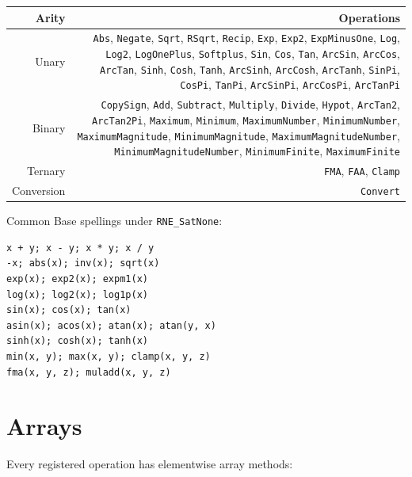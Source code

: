 \begin{table}[h]
\centering
\begin{tabulary}{\linewidth}{R R}
\toprule
Arity & Operations \\
\toprule
Unary & \texttt{Abs}, \texttt{Negate}, \texttt{Sqrt}, \texttt{RSqrt}, \texttt{Recip}, \texttt{Exp}, \texttt{Exp2}, \texttt{ExpMinusOne}, \texttt{Log}, \texttt{Log2}, \texttt{LogOnePlus}, \texttt{Softplus}, \texttt{Sin}, \texttt{Cos}, \texttt{Tan}, \texttt{ArcSin}, \texttt{ArcCos}, \texttt{ArcTan}, \texttt{Sinh}, \texttt{Cosh}, \texttt{Tanh}, \texttt{ArcSinh}, \texttt{ArcCosh}, \texttt{ArcTanh}, \texttt{SinPi}, \texttt{CosPi}, \texttt{TanPi}, \texttt{ArcSinPi}, \texttt{ArcCosPi}, \texttt{ArcTanPi} \\
Binary & \texttt{CopySign}, \texttt{Add}, \texttt{Subtract}, \texttt{Multiply}, \texttt{Divide}, \texttt{Hypot}, \texttt{ArcTan2}, \texttt{ArcTan2Pi}, \texttt{Maximum}, \texttt{Minimum}, \texttt{MaximumNumber}, \texttt{MinimumNumber}, \texttt{MaximumMagnitude}, \texttt{MinimumMagnitude}, \texttt{MaximumMagnitudeNumber}, \texttt{MinimumMagnitudeNumber}, \texttt{MinimumFinite}, \texttt{MaximumFinite} \\
Ternary & \texttt{FMA}, \texttt{FAA}, \texttt{Clamp} \\
Conversion & \texttt{Convert} \\
\bottomrule
\end{tabulary}

\end{table}



Common Base spellings under \texttt{RNE\_SatNone}:




\begin{verbatim}
x + y; x - y; x * y; x / y
-x; abs(x); inv(x); sqrt(x)
exp(x); exp2(x); expm1(x)
log(x); log2(x); log1p(x)
sin(x); cos(x); tan(x)
asin(x); acos(x); atan(x); atan(y, x)
sinh(x); cosh(x); tanh(x)
min(x, y); max(x, y); clamp(x, y, z)
fma(x, y, z); muladd(x, y, z)
\end{verbatim}



\section{Arrays}



\label{13119822296912292823}{}


Every registered operation has elementwise array methods:




